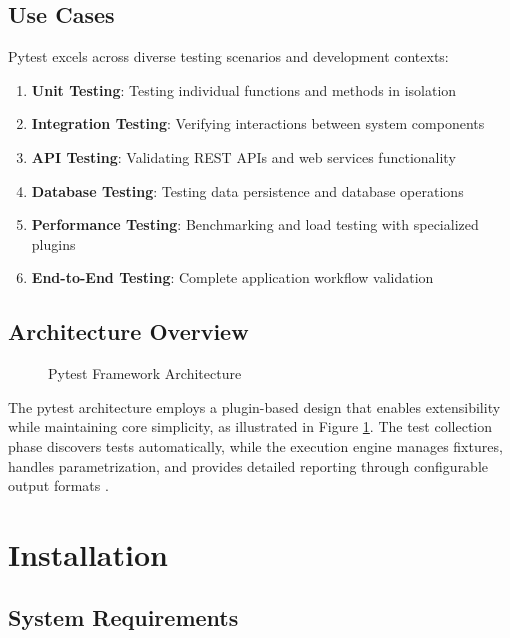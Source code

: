 \subsection{Use Cases}
\label{subsec:usecases}

Pytest excels across diverse testing scenarios and development contexts:

\begin{enumerate}
	\item \textbf{Unit Testing}: Testing individual functions and methods in isolation
	\item \textbf{Integration Testing}: Verifying interactions between system components
	\item \textbf{API Testing}: Validating REST APIs and web services functionality
	\item \textbf{Database Testing}: Testing data persistence and database operations
	\item \textbf{Performance Testing}: Benchmarking and load testing with specialized plugins
	\item \textbf{End-to-End Testing}: Complete application workflow validation
\end{enumerate}

\subsection{Architecture Overview}
\label{subsec:architecture}

\begin{figure}[H]
	\centering
	
	\caption{Pytest Framework Architecture \cite{Pytest:2024}}
	\label{fig:pytest_architecture}
\end{figure}

The pytest architecture employs a plugin-based design that enables extensibility while maintaining core simplicity, as illustrated in Figure \ref{fig:pytest_architecture}. The test collection phase discovers tests automatically, while the execution engine manages fixtures, handles parametrization, and provides detailed reporting through configurable output formats \cite{Pytest:2024}.

\clearpage

\section{Installation}
\label{sec:installation}

\subsection{System Requirements}
\label{subsec:system_requirements}

